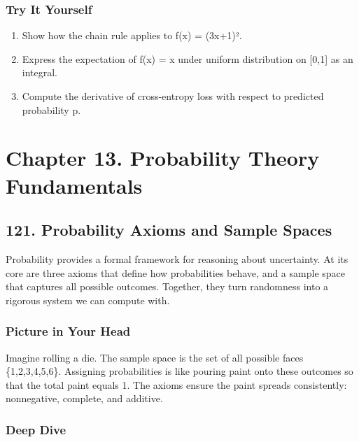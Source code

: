 \documentclass[
  letterpaper,
  DIV=11,
  numbers=noendperiod]{scrreprt}
\providecommand{\tightlist}{%
  \setlength{\itemsep}{0pt}\setlength{\parskip}{0pt}}
\begin{document}
\subsubsection{Try It Yourself}\label{try-it-yourself-119}

\begin{enumerate}
\def\labelenumi{\arabic{enumi}.}
\tightlist
\item
  Show how the chain rule applies to f(x) = (3x+1)².
\item
  Express the expectation of f(x) = x under uniform distribution on
  {[}0,1{]} as an integral.
\item
  Compute the derivative of cross-entropy loss with respect to predicted
  probability p.
\end{enumerate}

\section{Chapter 13. Probability Theory
Fundamentals}\label{chapter-13.-probability-theory-fundamentals}

\subsection{121. Probability Axioms and Sample
Spaces}\label{probability-axioms-and-sample-spaces}

Probability provides a formal framework for reasoning about uncertainty.
At its core are three axioms that define how probabilities behave, and a
sample space that captures all possible outcomes. Together, they turn
randomness into a rigorous system we can compute with.

\subsubsection{Picture in Your Head}\label{picture-in-your-head-120}

Imagine rolling a die. The sample space is the set of all possible faces
\{1,2,3,4,5,6\}. Assigning probabilities is like pouring paint onto
these outcomes so that the total paint equals 1. The axioms ensure the
paint spreads consistently: nonnegative, complete, and additive.

\subsubsection{Deep Dive}\label{deep-dive-120}
\end{document}
